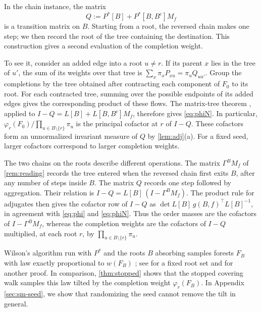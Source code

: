 \documentclass[onefignum,onetabnum]{siamart250211}
\numberwithin{theorem}{section}
\numberwithin{equation}{section}
\begin{document}
\begin{remark}\label{rem:contract}
In the chain instance, the matrix
\[
Q:=P^{*}[B]+P^{*}[B,B^c]M_f
\]
is a transition matrix on $B$. Starting from a root, the reversed
chain makes one step; we then record the root of the tree containing
the destination. This construction gives a second evaluation of the
completion weight.

To see it, consider an added edge into a root $u\ne r$. If its parent
$x$ lies in the tree of $u'$, the sum of its weights over that tree is
$\sum_x\pi_xP_{xu}=\pi_uQ_{uu'}$. Group the completions by the tree
obtained after contracting each component of $F_0$ to its root.
For each contracted tree, summing over the possible endpoints of its
added edges gives the corresponding product of these flows. The
matrix-tree theorem \cite{Tutte1948,Chaiken1982}, applied to
$I-Q=L[B]+L[B,B^c]M_f$, therefore gives \eqref{eq:phiN}.
In particular,
$\varphi_r(F_0)/\prod_{u\in B\setminus\{r\}}\pi_u$ is the principal
cofactor at $r$ of $I-Q$. These cofactors form an unnormalized
invariant measure of $Q$ by \cref{lem:adj}(a). For a fixed seed, larger
cofactors correspond to larger completion weights.

The two chains on the roots describe different operations.
The matrix $\Gamma^BM_f$ of \cref{rem:reading} records the tree
entered when the reversed chain first exits $B$, after any number of
steps inside $B$. The matrix $Q$ records one step followed by
aggregation. Their relation is
$I-Q=L[B]\,(I-\Gamma^BM_f)$. The product rule for adjugates then gives
the cofactor row of $I-Q$ as
$\det L[B]\,g(B,f)^{\top}L[B]^{-1}$, in agreement with
\eqref{eq:phi} and \eqref{eq:phiN}. Thus the order masses are the
cofactors of $I-\Gamma^BM_f$, whereas the completion weights are the
cofactors of $I-Q$ multiplied, at each root $r$, by
$\prod_{u\in B\setminus\{r\}}\pi_u$.

\end{remark}



\begin{remark}\label{rem:wilson}
Wilson's algorithm run with $P^{*}$ and the roots $B$ absorbing samples
forests $F_B$ with law exactly proportional to $w(F_B)$
\cite{Wilson1996,ProppWilson1998}; see
\cite[Cor.~2.3]{AvenaGaudilliere2018forests} for a fixed root set and
\cite{Marchal2000} for another proof. In
comparison, \cref{thm:stopped} shows that the stopped covering walk
samples this law tilted by the completion weight $\varphi_r(F_B)$. In
Appendix \ref{sec:sm-seed}, we show that randomizing the seed cannot remove the
tilt in general.
\end{remark}
\end{document}
